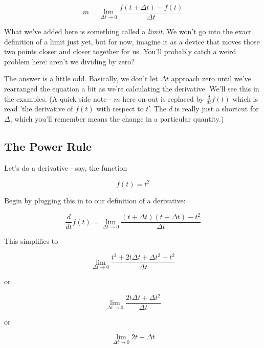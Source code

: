 \begin{equation*}
    m = \lim\limits_{\Delta t\rightarrow 0} \frac{f(t+\Delta t)-f(t)}{\Delta t}
\end{equation*}

What we've added here is something called a {\it limit}. We won't go into the exact definition of a limit just yet, but for now, imagine it as a device that moves those two points closer and closer together for us. You'll probably catch a weird problem here: aren't we dividing by zero?

The answer is a little odd. Basically, we don't let $\Delta t$ approach zero until we've rearranged the equation a bit as we're calculating the derivative. We'll see this in the examples. (A quick side note - $m$ here on out is replaced by $\frac{d}{dt} f(t)$ which is read 'the derivative of $f(t)$ with respect to $t$'. The $d$ is really just a shortcut for $\Delta$, which you'll remember means the change in a particular quantity.)

\subsection{The Power Rule}

Let's do a derivative - say, the function

\begin{equation*}
    f(t) = t^2
\end{equation*}

Begin by plugging this in to our definition of a derivative:

\begin{equation*}
    \frac{d}{dt}f(t) = \lim\limits_{\Delta t\rightarrow 0}\frac{(t+\Delta t)(t+\Delta t) - t^2}{\Delta t}
\end{equation*}

This simplifies to

\begin{equation*}
    \lim\limits_{\Delta t\rightarrow 0}\frac{t^2 + 2t\Delta t + \Delta t^2 - t^2}{\Delta t}
\end{equation*}

or

\begin{equation*}
    \lim\limits_{\Delta t\rightarrow 0}\frac{2t\Delta t + \Delta t^2}{\Delta t}
\end{equation*}

or

\begin{equation*}
    \lim\limits_{\Delta t\rightarrow 0} 2t + \Delta t
\end{equation*}

